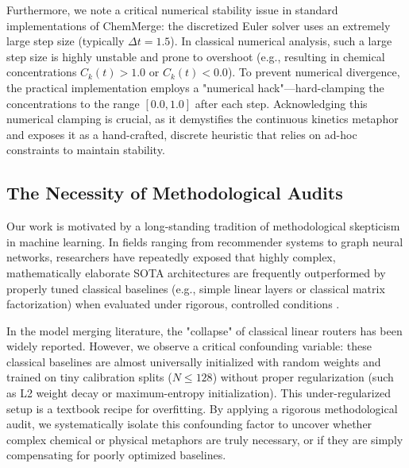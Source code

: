 Furthermore, we note a critical numerical stability issue in standard implementations of ChemMerge: the discretized Euler solver uses an extremely large step size (typically $\Delta t = 1.5$). In classical numerical analysis, such a large step size is highly unstable and prone to overshoot (e.g., resulting in chemical concentrations $C_k(t) > 1.0$ or $C_k(t) < 0.0$). To prevent numerical divergence, the practical implementation employs a "numerical hack"---hard-clamping the concentrations to the range $[0.0, 1.0]$ after each step. Acknowledging this numerical clamping is crucial, as it demystifies the continuous kinetics metaphor and exposes it as a hand-crafted, discrete heuristic that relies on ad-hoc constraints to maintain stability.

\subsection{The Necessity of Methodological Audits}
Our work is motivated by a long-standing tradition of methodological skepticism in machine learning. In fields ranging from recommender systems to graph neural networks, researchers have repeatedly exposed that highly complex, mathematically elaborate SOTA architectures are frequently outperformed by properly tuned classical baselines (e.g., simple linear layers or classical matrix factorization) when evaluated under rigorous, controlled conditions \citep{langley00, mitchell80, kearns89}. 

In the model merging literature, the "collapse" of classical linear routers has been widely reported. However, we observe a critical confounding variable: these classical baselines are almost universally initialized with random weights and trained on tiny calibration splits ($N \le 128$) without proper regularization (such as L2 weight decay or maximum-entropy initialization). This under-regularized setup is a textbook recipe for overfitting. By applying a rigorous methodological audit, we systematically isolate this confounding factor to uncover whether complex chemical or physical metaphors are truly necessary, or if they are simply compensating for poorly optimized baselines.
